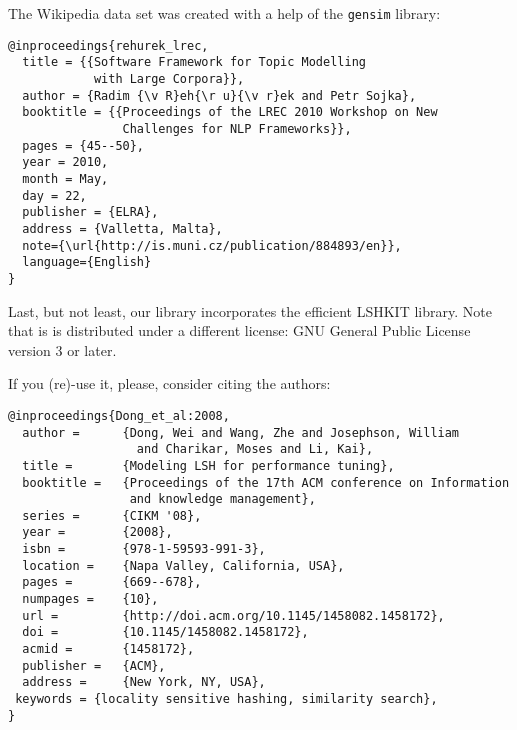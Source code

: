 \documentclass[runningheads,a4paper]{llncs}
\newcommand{\ttt}[1]{\texttt{#1}}
\begin{document}
The Wikipedia data set was created with a help of the \ttt{gensim} library:

\begin{verbatim}
@inproceedings{rehurek_lrec,
  title = {{Software Framework for Topic Modelling 
            with Large Corpora}},
  author = {Radim {\v R}eh{\r u}{\v r}ek and Petr Sojka},
  booktitle = {{Proceedings of the LREC 2010 Workshop on New
                Challenges for NLP Frameworks}},
  pages = {45--50},
  year = 2010,
  month = May,
  day = 22,
  publisher = {ELRA},
  address = {Valletta, Malta},
  note={\url{http://is.muni.cz/publication/884893/en}},
  language={English}
}
\end{verbatim}

Last, but not least, our library incorporates the efficient LSHKIT library.
Note that is is distributed under a different license: 
GNU General Public License version 3 or later. 

If you (re)-use it, please, consider citing the authors:

\begin{verbatim}
@inproceedings{Dong_et_al:2008,
  author =      {Dong, Wei and Wang, Zhe and Josephson, William 
                  and Charikar, Moses and Li, Kai},
  title =       {Modeling LSH for performance tuning},
  booktitle =   {Proceedings of the 17th ACM conference on Information
                 and knowledge management},
  series =      {CIKM '08},
  year =        {2008},
  isbn =        {978-1-59593-991-3},
  location =    {Napa Valley, California, USA},
  pages =       {669--678},
  numpages =    {10},
  url =         {http://doi.acm.org/10.1145/1458082.1458172},
  doi =         {10.1145/1458082.1458172},
  acmid =       {1458172},
  publisher =   {ACM},
  address =     {New York, NY, USA},
 keywords = {locality sensitive hashing, similarity search},
} 
\end{verbatim}

\label{SectionCredits}


%

\end{document}
